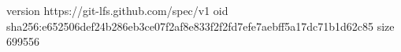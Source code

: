 version https://git-lfs.github.com/spec/v1
oid sha256:e652506def24b286eb3ce07f2af8e833f2f2fd7efe7aebff5a17dc71b1d62c85
size 699556
